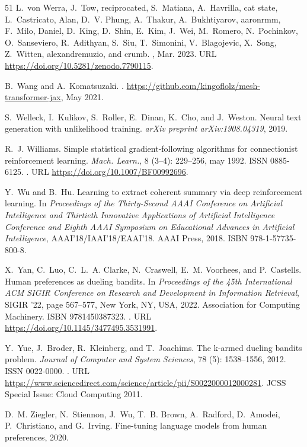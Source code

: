 \begin{thebibliography}{51}
L.~von Werra, J.~Tow, reciprocated, S.~Matiana, A.~Havrilla, cat state,
  L.~Castricato, Alan, D.~V. Phung, A.~Thakur, A.~Bukhtiyarov, aaronrmm,
  F.~Milo, Daniel, D.~King, D.~Shin, E.~Kim, J.~Wei, M.~Romero, N.~Pochinkov,
  O.~Sanseviero, R.~Adithyan, S.~Siu, T.~Simonini, V.~Blagojevic, X.~Song,
  Z.~Witten, alexandremuzio, and crumb.
, Mar. 2023.
\newblock URL \url{https://doi.org/10.5281/zenodo.7790115}.

B.~Wang and A.~Komatsuzaki.
.
\newblock \url{https://github.com/kingoflolz/mesh-transformer-jax}, May 2021.

S.~Welleck, I.~Kulikov, S.~Roller, E.~Dinan, K.~Cho, and J.~Weston.
\newblock Neural text generation with unlikelihood training.
\newblock \emph{arXiv preprint arXiv:1908.04319}, 2019.

R.~J. Williams.
\newblock Simple statistical gradient-following algorithms for connectionist
  reinforcement learning.
\newblock \emph{Mach. Learn.}, 8 (3–4): 229–256, may
  1992.
\newblock ISSN 0885-6125.
\newblock {}.
\newblock URL \url{https://doi.org/10.1007/BF00992696}.

Y.~Wu and B.~Hu.
\newblock Learning to extract coherent summary via deep reinforcement learning.
\newblock In \emph{Proceedings of the Thirty-Second AAAI Conference on
  Artificial Intelligence and Thirtieth Innovative Applications of Artificial
  Intelligence Conference and Eighth AAAI Symposium on Educational Advances in
  Artificial Intelligence}, AAAI'18/IAAI'18/EAAI'18. AAAI Press, 2018.
\newblock ISBN 978-1-57735-800-8.

X.~Yan, C.~Luo, C.~L.~A. Clarke, N.~Craswell, E.~M. Voorhees, and P.~Castells.
\newblock Human preferences as dueling bandits.
\newblock In \emph{Proceedings of the 45th International ACM SIGIR Conference
  on Research and Development in Information Retrieval}, SIGIR '22, page
  567–577, New York, NY, USA, 2022. Association for Computing Machinery.
\newblock ISBN 9781450387323.
\newblock {}.
\newblock URL \url{https://doi.org/10.1145/3477495.3531991}.

Y.~Yue, J.~Broder, R.~Kleinberg, and T.~Joachims.
\newblock The k-armed dueling bandits problem.
\newblock \emph{Journal of Computer and System Sciences}, 78
  (5): 1538--1556, 2012.
\newblock ISSN 0022-0000.
\newblock {}.
\newblock URL
  \url{https://www.sciencedirect.com/science/article/pii/S0022000012000281}.
\newblock JCSS Special Issue: Cloud Computing 2011.

D.~M. Ziegler, N.~Stiennon, J.~Wu, T.~B. Brown, A.~Radford, D.~Amodei,
  P.~Christiano, and G.~Irving.
\newblock Fine-tuning language models from human preferences, 2020.

\end{thebibliography}
